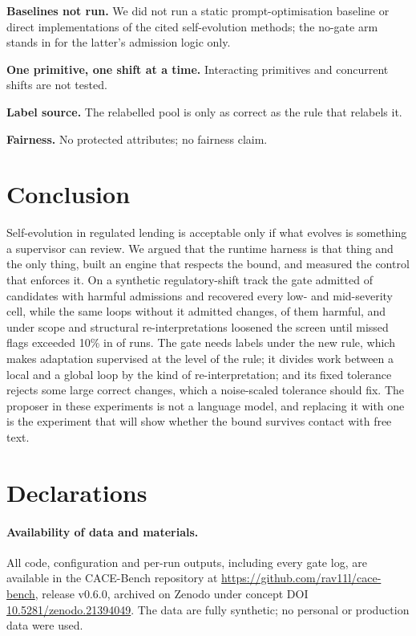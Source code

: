 \documentclass[11pt]{article}
\newif\ifanon
\begin{document}
\textbf{Baselines not run.} We did not run a static prompt-optimisation baseline or direct implementations of the cited self-evolution methods; the no-gate arm stands in for the latter's admission logic only.

\textbf{One primitive, one shift at a time.} Interacting primitives and concurrent shifts are not tested.

\textbf{Label source.} The relabelled pool is only as correct as the rule that relabels it.

\textbf{Fairness.} No protected attributes; no fairness claim.

\section{Conclusion}

Self-evolution in regulated lending is acceptable only if what evolves is something a supervisor can review. We argued that the runtime harness is that thing and the only thing, built an engine that respects the bound, and measured the control that enforces it. On a synthetic regulatory-shift track the gate admitted \gadmdual{} of \gpropdual{} candidates with \gfadual{} harmful admissions and recovered every low- and mid-severity cell, while the same loops without it admitted \gadmnogate{} changes, \gfanogate{} of them harmful, and under scope and structural re-interpretations loosened the screen until missed flags exceeded 10\% in \gmtennogate{} of \ncells{} runs. The gate needs labels under the new rule, which makes adaptation supervised at the level of the rule; it divides work between a local and a global loop by the kind of re-interpretation; and its fixed tolerance rejects some large correct changes, which a noise-scaled tolerance should fix. The proposer in these experiments is not a language model, and replacing it with one is the experiment that will show whether the bound survives contact with free text.

\section*{Declarations}

\paragraph{Availability of data and materials.} All code, configuration and per-run outputs, including every gate log, are available in the CACE-Bench repository\ifanon{} (anonymised mirror supplied to the editor)\else{} at \url{https://github.com/rav11l/cace-bench}, release v0.6.0, archived on Zenodo under concept DOI \href{https://doi.org/10.5281/zenodo.21394049}{10.5281/zenodo.21394049}\fi. The data are fully synthetic; no personal or production data were used.
\end{document}
